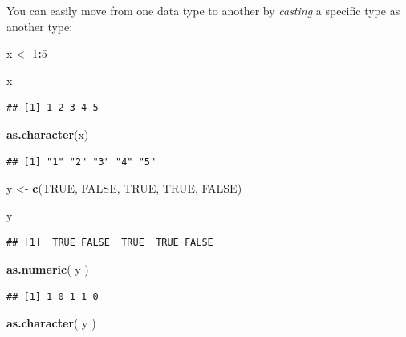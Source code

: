 \documentclass[]{book}
\newenvironment{Shaded}{\begin{snugshade}}{\end{snugshade}}
\newcommand{\DecValTok}[1]{\textcolor[rgb]{0.00,0.00,0.81}{#1}}
\newcommand{\KeywordTok}[1]{\textcolor[rgb]{0.13,0.29,0.53}{\textbf{#1}}}
\newcommand{\NormalTok}[1]{#1}
\newcommand{\OperatorTok}[1]{\textcolor[rgb]{0.81,0.36,0.00}{\textbf{#1}}}
\newcommand{\OtherTok}[1]{\textcolor[rgb]{0.56,0.35,0.01}{#1}}
\newcommand{\StringTok}[1]{\textcolor[rgb]{0.31,0.60,0.02}{#1}}
\theoremstyle{definition}
\theoremstyle{definition}
\theoremstyle{definition}
\theoremstyle{remark}
\begin{document}
You can easily move from one data type to another by \emph{casting} a
specific type as another type:

\begin{Shaded}
\begin{Highlighting}[]
\NormalTok{x <-}\StringTok{ }\DecValTok{1}\OperatorTok{:}\DecValTok{5}

\NormalTok{x}
\end{Highlighting}
\end{Shaded}

\begin{verbatim}
## [1] 1 2 3 4 5
\end{verbatim}

\begin{Shaded}
\begin{Highlighting}[]
\KeywordTok{as.character}\NormalTok{(x)}
\end{Highlighting}
\end{Shaded}

\begin{verbatim}
## [1] "1" "2" "3" "4" "5"
\end{verbatim}

\begin{Shaded}
\begin{Highlighting}[]
\NormalTok{y <-}\StringTok{ }\KeywordTok{c}\NormalTok{(}\OtherTok{TRUE}\NormalTok{, }\OtherTok{FALSE}\NormalTok{, }\OtherTok{TRUE}\NormalTok{, }\OtherTok{TRUE}\NormalTok{, }\OtherTok{FALSE}\NormalTok{)}

\NormalTok{y}
\end{Highlighting}
\end{Shaded}

\begin{verbatim}
## [1]  TRUE FALSE  TRUE  TRUE FALSE
\end{verbatim}

\begin{Shaded}
\begin{Highlighting}[]
\KeywordTok{as.numeric}\NormalTok{( y )}
\end{Highlighting}
\end{Shaded}

\begin{verbatim}
## [1] 1 0 1 1 0
\end{verbatim}

\begin{Shaded}
\begin{Highlighting}[]
\KeywordTok{as.character}\NormalTok{( y )}
\end{Highlighting}
\end{Shaded}
\end{document}
